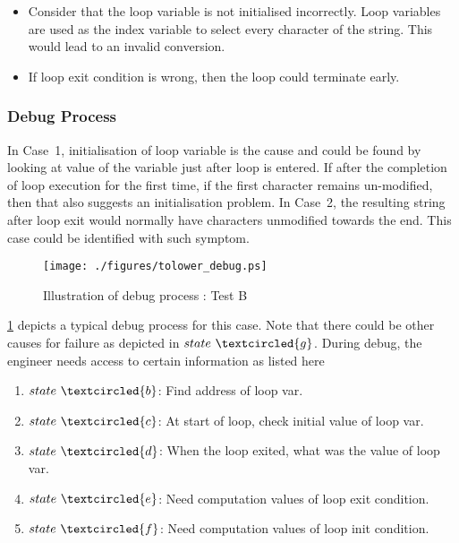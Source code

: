 \begin{itemize}

\item [Case 1:] Consider that the loop variable is not initialised incorrectly. Loop variables are used as the index variable to select every character of the string. This would lead to an invalid conversion. \label{algo:tolow:case1}

\item [Case 2:] If loop exit condition is wrong, then the loop could terminate early. \label{algo:tolow:case2}
\end{itemize}

\subsubsection{Debug Process}

In Case~1, initialisation of loop variable is the cause and could be found by looking at value of the variable just after loop is entered. If after the completion of loop execution for the first time, if the first character remains un-modified, then that also suggests an initialisation problem.
In Case~2, the resulting string after loop exit would normally have characters unmodified towards the end. This case could be identified with such symptom.

\begin{figure}[h]
\centering
\texttt{[image: ./figures/tolower\_debug.ps]}
\caption{Illustration of debug process : Test B} 
\label{fig:tolower_debug.ps}
\end{figure}

\figurename{\ref{fig:tolower_debug.ps}} depicts a typical debug process for this case. Note that there could be other causes for failure as depicted in $state~\textcircled{g}$. During debug, the engineer needs access to certain information as listed here

\begin{enumerate}
\item $state~\textcircled{b}$: Find address of loop var.
\item $state~\textcircled{c}$: At start of loop, check initial value of loop var.
\item $state~\textcircled{d}$: When the loop exited, what was the value of loop var.
\item $state~\textcircled{e}$: Need computation values of loop exit condition.
\item $state~\textcircled{f}$: Need computation values of loop init condition.
\end{enumerate}

